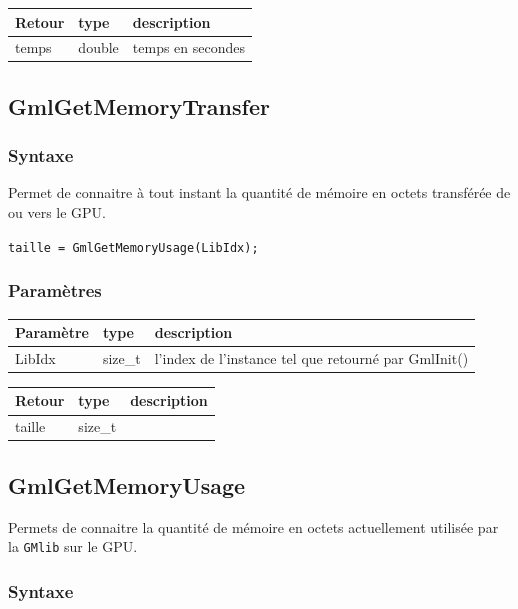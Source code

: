 \documentclass[a4paper,12pt]{article}
\begin{document}
\medskip

\begin{tabular}{|m{2cm}|m{1.5cm}|m{10.5cm}|}
\hline
Retour     & type    & description \\
\hline
temps      & double  & temps en secondes \\
\hline
\end{tabular}


\subsection{GmlGetMemoryTransfer}

\subsubsection*{Syntaxe}

Permet de connaitre à tout instant la quantité de mémoire en octets transférée de ou vers le GPU.

{\tt taille = GmlGetMemoryUsage(LibIdx);}

\subsubsection*{Paramètres}

\begin{tabular}{|m{2cm}|m{1.5cm}|m{10.5cm}|}
\hline
Paramètre  & type    & description \\
\hline
LibIdx     & size\_t & l'index de l'instance tel que retourné par GmlInit() \\
\hline
\end{tabular}

\medskip

\begin{tabular}{|m{2cm}|m{1.5cm}|m{10.5cm}|}
\hline
Retour     & type    & description \\
\hline
taille     & size\_t & \\
\hline
\end{tabular}


\subsection{GmlGetMemoryUsage}

Permets de connaitre la quantité de mémoire en octets actuellement utilisée par la {\tt GMlib} sur le GPU.

\subsubsection*{Syntaxe}
\end{document}
